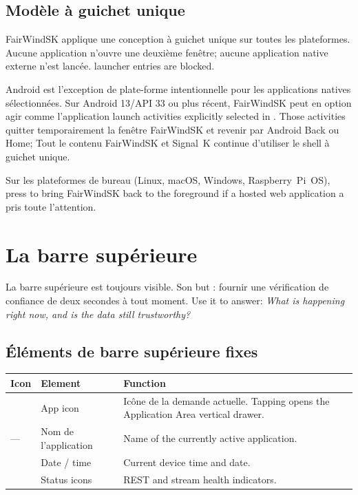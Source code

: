 \section{Modèle à guichet unique}

FairWindSK applique une conception à guichet unique sur toutes les plateformes.
Aucune application n'ouvre une deuxième fenêtre; aucune application native externe n'est lancée.
 launcher entries are blocked.

Android est l'exception de plate-forme intentionnelle pour les applications natives sélectionnées.
Sur Android 13/API 33 ou plus récent, FairWindSK peut en option agir comme l'application
launch activities explicitly selected in . Those activities
quitter temporairement la fenêtre FairWindSK et revenir par Android Back ou Home;
Tout le contenu FairWindSK et Signal~K continue d'utiliser le shell à guichet unique.

Sur les plateformes de bureau (Linux, macOS, Windows, Raspberry~Pi~OS),
press  to bring FairWindSK back to the foreground if a hosted web
application a pris toute l'attention.

\chapter{La barre supérieure}
\label{ch:topbar}

La barre supérieure est toujours visible.
Son but : fournir une vérification de confiance de deux secondes à tout moment.
Use it to answer: \textit{What is happening right now, and is the data still
trustworthy?}


\section{Éléments de barre supérieure fixes}

\begin{longtable}{C{1.5cm}L{2.8cm}L{9.4cm}}
\toprule
{}
\color{white}\sffamily\bfseries Icon &
\color{white}\sffamily\bfseries Element &
\color{white}\sffamily\bfseries Function \\
\midrule
{}       & App icon    &
Icône de la demande actuelle.
  Tapping opens the Application Area vertical drawer. \\
---                     &Nom de l'application&
  Name of the currently active application. \\
     & Date / time &
  Current device time and date. \\
& Status icons &
  REST and stream health indicators. \\
\bottomrule
\end{longtable}

